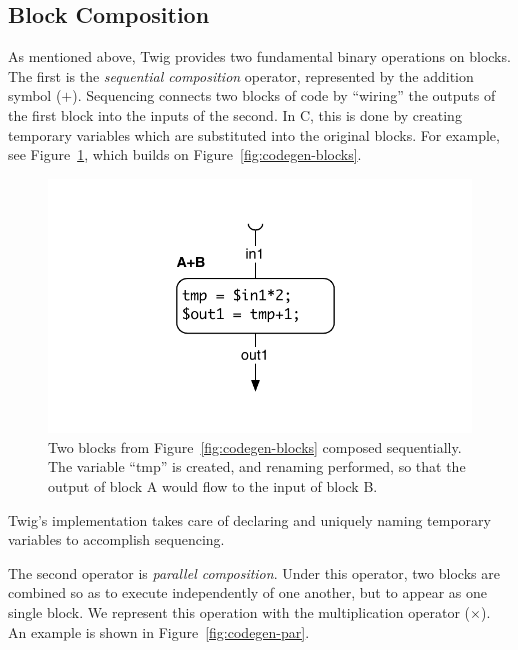 \subsection{Block Composition}

As mentioned above, Twig provides two fundamental binary operations on blocks.
The first is the \emph{sequential composition} operator, represented by the
addition symbol ($+$). Sequencing connects two blocks of code by ``wiring'' the
outputs of the first block into the inputs of the second. In C, this is done by
creating temporary variables which are substituted into the original blocks. For
example, see Figure~\ref{fig:codegen-seq}, which builds on
Figure~\ref{fig:codegen-blocks}.

\begin{figure}[ht]
\centering
\includegraphics[width=\columnwidth]{images/code-gen2}
\caption{Two blocks from Figure~\ref{fig:codegen-blocks} composed sequentially.
The variable ``tmp'' is created, and renaming performed, so that the output of
block A would flow to the input of block B.}
\label{fig:codegen-seq}
\end{figure}

Twig's implementation takes care of declaring and uniquely naming
temporary variables to accomplish sequencing.

The second operator is \emph{parallel composition}. Under this operator, two
blocks are combined so as to execute independently of one another, but to appear
as one single block. We represent this operation with the multiplication
operator ($\times$). An example is shown in Figure~\ref{fig:codegen-par}.

